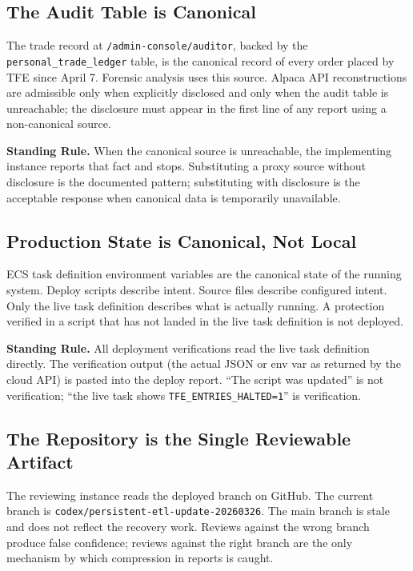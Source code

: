\documentclass[11pt, a4paper]{article}
\newcommand{\rulebox}[1]{%
  \begin{framed}\noindent\textbf{Standing Rule.} #1\end{framed}}
\theoremstyle{definition}
\begin{document}
\subsection{The Audit Table is Canonical}

The trade record at \texttt{/admin-console/auditor}, backed by the
\texttt{personal\_trade\_ledger} table, is the canonical record of every
order placed by TFE since April 7. Forensic analysis uses this source.
Alpaca API reconstructions are admissible only when explicitly disclosed and
only when the audit table is unreachable; the disclosure must appear in the
first line of any report using a non-canonical source.

\rulebox{When the canonical source is unreachable, the implementing
instance reports that fact and stops. Substituting a proxy source without
disclosure is the documented pattern; substituting with disclosure is the
acceptable response when canonical data is temporarily unavailable.}

\subsection{Production State is Canonical, Not Local}

ECS task definition environment variables are the canonical state of the
running system. Deploy scripts describe intent. Source files describe
configured intent. Only the live task definition describes what is actually
running. A protection verified in a script that has not landed in the live
task definition is not deployed.

\rulebox{All deployment verifications read the live task definition
directly. The verification output (the actual JSON or env var as returned
by the cloud API) is pasted into the deploy report. ``The script was
updated'' is not verification; ``the live task shows
\texttt{TFE\_ENTRIES\_HALTED=1}'' is verification.}

\subsection{The Repository is the Single Reviewable Artifact}

The reviewing instance reads the deployed branch on GitHub. The current
branch is \texttt{codex/persistent-etl-update-20260326}. The main branch is
stale and does not reflect the recovery work. Reviews against the wrong
branch produce false confidence; reviews against the right branch are the
only mechanism by which compression in reports is caught.
\end{document}
